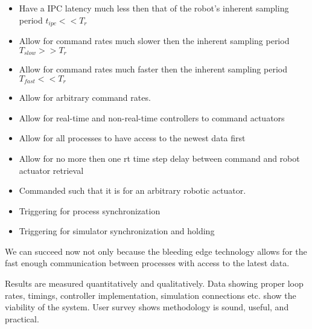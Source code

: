 \begin{itemize}
\item Have a IPC latency much less then that of the robot's inherent sampling period $t_{ipc}<<T_{r}$
\item Allow for command rates much slower then the inherent sampling period $T_{slow}>>T_{r}$
\item Allow for command rates much faster then the inherent sampling period $T_{fast}<<T_{r}$
\item Allow for arbitrary command rates.
\item Allow for real-time and non-real-time controllers to command actuators
\item Allow for all processes to have access to the newest data first
\item Allow for no more then one rt time step delay between command and robot actuator retrieval
\item Commanded such that it is for an arbitrary robotic actuator.
\item Triggering for process synchronization
\item Triggering for simulator synchronization and holding
\end{itemize}
We can succeed now not only because the bleeding edge technology allows for the fast enough communication between processes with access to the latest data.

Results are measured quantitatively and qualitatively.
Data showing proper loop rates, timings, controller implementation, simulation connections etc. show the viability of the system.
User survey shows methodology is sound, useful, and practical.








